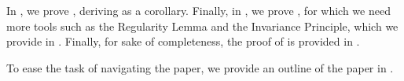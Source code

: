 \documentclass[11pt]{article}
\newcommand{\inparen}[1]{\left ( #1 \right )}
\newcommand{\norm}[2]{\begin{Vmatrix} #2 \end{Vmatrix}_{#1}}
\newcommand{\sAND}{\ \mathrm{and} \ }
\newcommand{\wtilde}[1]{\widetilde{#1}}
\newcommand{\bbR}{{\mathbb R}}
\newcommand{\ba}{{\bm a}}
\newcommand{\bb}{{\bm b}}
\begin{document}
In , we prove , deriving  as a corollary. Finally, in , we prove , for which we need more tools such as the Regularity Lemma and the Invariance Principle, which we provide in . Finally, for sake of completeness, the proof of  is provided in .

To ease the task of navigating the paper, we provide an outline of the paper in .

%
%
%
\end{document}
